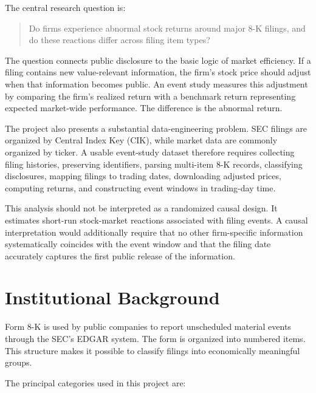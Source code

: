 \documentclass[12pt]{article}
\begin{document}
The central research question is:

\begin{quote}
Do firms experience abnormal stock returns around major 8-K filings, and do these reactions differ across filing item types?
\end{quote}

The question connects public disclosure to the basic logic of market efficiency. If a filing contains new value-relevant information, the firm's stock price should adjust when that information becomes public. An event study measures this adjustment by comparing the firm's realized return with a benchmark return representing expected market-wide performance. The difference is the abnormal return.

The project also presents a substantial data-engineering problem. SEC filings are organized by Central Index Key (CIK), while market data are commonly organized by ticker. A usable event-study dataset therefore requires collecting filing histories, preserving identifiers, parsing multi-item 8-K records, classifying disclosures, mapping filings to trading dates, downloading adjusted prices, computing returns, and constructing event windows in trading-day time.

This analysis should not be interpreted as a randomized causal design. It estimates short-run stock-market reactions associated with filing events. A causal interpretation would additionally require that no other firm-specific information systematically coincides with the event window and that the filing date accurately captures the first public release of the information.

\section{Institutional Background}

Form 8-K is used by public companies to report unscheduled material events through the SEC's EDGAR system. The form is organized into numbered items. This structure makes it possible to classify filings into economically meaningful groups.

The principal categories used in this project are:
\end{document}
